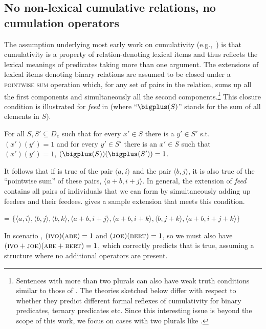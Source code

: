 \documentclass[output=paper]{langscibook}
\begin{document}
\subsection{No non-lexical cumulative relations, no cumulation operators}\label{has-sch:sec:2.1}

The assumption underlying most early work on cumulativity (e.g.,~\citealt{Scha:1981, Krifka:1986}) is that cumulativity is a property of relation-denoting lexical items and thus reflects the lexical meanings of predicates taking more than one argument. The extensions of lexical items denoting binary relations are assumed to be closed under a \textsc{pointwise sum} operation which, for any set of pairs in the relation, sums up all the first components and simultaneously all the second components.\footnote{Sentences with more than two plurals can also have weak truth conditions similar to those of . The theories sketched below differ with respect to whether they predict different formal reflexes of cumulativity for binary predicates, ternary predicates etc. Since this interesting issue is beyond the scope of this work, we focus on cases with two plurals like .} This closure condition is illustrated for \textit{feed} in  (where ``$\bigplus (S)$'' stands for the sum of all elements in $S$).

\ea\label{has-sch:ruule} For all $S, S' \subseteq D_{e}$ such that for every $x' \in S$ there is a $y' \in S'$ s.t. $(x')(y') = 1$ and for every $y' \in S'$ there is an $x' \in S$ such that $(x')(y') = 1$, $(\bigplus(S))(\bigplus(S'))= 1$. \z

\noindent It follows that if  is true of the pair ${\langle a, i\rangle}$ and the pair ${\langle b, j\rangle}$, it is also true of the ``pointwise sum'' of these pairs, ${\langle a+b, i+j\rangle}$. In general, the extension of \textit{feed} contains all pairs of individuals that we can form by simultaneously adding up feeders and their feedees.  gives a sample extension that meets this condition.

\ea\label{has-sch:6}  = $\{\langle a, i\rangle, \langle b, j\rangle, \langle b, k\rangle, \langle a+b, i+j\rangle, \langle a+b, i+k\rangle, \langle b, j+k\rangle, \langle a+b, i+j+k\rangle\}$ \z

\noindent In scenario , $(\textsc{ivo})(\textsc{abe}) = 1$ and $(\textsc{joe})(\textsc{bert}) = 1$, so we must also have $(\textsc{ivo}+\textsc{joe})(\textsc{abe}+\textsc{bert}) = 1$, which correctly predicts that  is true, assuming a structure where no additional operators are present.
\end{document}
